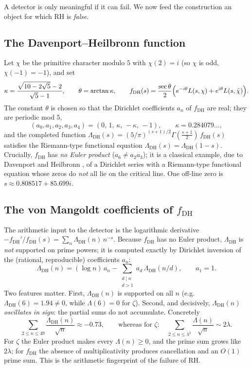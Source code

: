 \documentclass[11pt]{amsart}
\theoremstyle{definition}
\theoremstyle{remark}
\newcommand{\lam}{\lambda}
\begin{document}
A detector is only meaningful if it can fail. We now feed the construction an object for which RH is \emph{false}.

\subsection{The Davenport--Heilbronn function}
Let $\chi$ be the primitive character modulo $5$ with $\chi(2)=i$ (so $\chi$ is odd, $\chi(-1)=-1$), and set
\[
\kappa=\frac{\sqrt{10-2\sqrt5}-2}{\sqrt5-1},\qquad \theta=\arctan\kappa,\qquad
f_{\mathrm{DH}}(s)=\frac{\sec\theta}{2}\Bigl(e^{-i\theta}L(s,\chi)+e^{i\theta}L(s,\bar\chi)\Bigr).
\]
The constant $\theta$ is chosen so that the Dirichlet coefficients $a_n$ of $f_{\mathrm{DH}}$ are real; they are periodic mod $5$,
\[
(a_0,a_1,a_2,a_3,a_4)=(0,\,1,\,\kappa,\,-\kappa,\,-1),\qquad \kappa=0.284079\ldots,
\]
and the completed function $\Lambda_{\mathrm{DH}}(s)=(5/\pi)^{(s+1)/2}\Gamma(\tfrac{s+1}{2})\,f_{\mathrm{DH}}(s)$ satisfies the Riemann-type functional equation $\Lambda_{\mathrm{DH}}(s)=\Lambda_{\mathrm{DH}}(1-s)$. Crucially, $f_{\mathrm{DH}}$ has \emph{no Euler product} ($a_6\ne a_2a_3$); it is a classical example, due to Davenport and Heilbronn \cite{DH1936}, of a Dirichlet series with a Riemann-type functional equation whose zeros do \emph{not} all lie on the critical line. One off-line zero is $s\approx 0.808517+85.699i$.

\subsection{The von Mangoldt coefficients of \texorpdfstring{$f_{\mathrm{DH}}$}{fDH}}
The arithmetic input to the detector is the logarithmic derivative $-f_{\mathrm{DH}}'/f_{\mathrm{DH}}(s)=\sum_n \Lambda_{\mathrm{DH}}(n)\,n^{-s}$. Because $f_{\mathrm{DH}}$ has no Euler product, $\Lambda_{\mathrm{DH}}$ is \emph{not} supported on prime powers; it is computed exactly by Dirichlet inversion of the (rational, reproducible) coefficients $a_n$:
\[
\Lambda_{\mathrm{DH}}(n)=(\log n)\,a_n-\sum_{\substack{d\mid n\\ d>1}}a_d\,\Lambda_{\mathrm{DH}}(n/d),\qquad a_1=1.
\]
Two features matter. First, $\Lambda_{\mathrm{DH}}(n)$ is supported on all $n$ (e.g.\ $\Lambda_{\mathrm{DH}}(6)=1.94\ne 0$, while $\Lambda(6)=0$ for $\zeta$). Second, and decisively, $\Lambda_{\mathrm{DH}}(n)$ \emph{oscillates in sign}: the partial sums do not accumulate. Concretely
\[
\sum_{2\le n\le 49}\frac{\Lambda_{\mathrm{DH}}(n)}{\sqrt n}\approx -0.73,
\qquad\text{whereas for }\zeta:\quad \sum_{2\le n\le\lam^2}\frac{\Lambda(n)}{\sqrt n}\sim 2\lam .
\]
For $\zeta$ the Euler product makes every $\Lambda(n)\ge0$, and the prime sum grows like $2\lam$; for $f_{\mathrm{DH}}$ the absence of multiplicativity produces cancellation and an $O(1)$ prime sum. This is the arithmetic fingerprint of the failure of RH.
\end{document}

